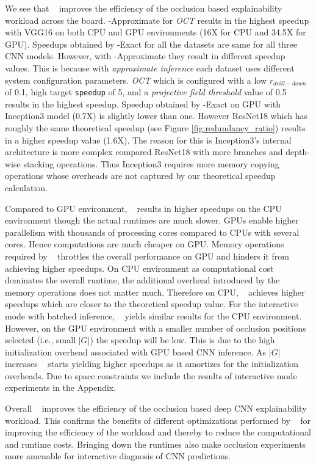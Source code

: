 We see that \system~ improves the efficiency of the occlusion based explainability workload across the board.
\system-Approximate for \textit{OCT} results in the highest speedup with VGG16 on both CPU and GPU environments (16X for CPU and 34.5X for GPU).
Speedups obtained by \system-Exact for all the datasets are same for all three CNN models.
However, with \system-Approximate they result in different speedup values.
This is because with \textit{approximate inference} each dataset uses different system configuration parameters.
\textit{OCT} which is configured with a low $r_{drill-down}$ of 0.1, high target \texttt{speedup} of 5, and a \textit{projective field threshold} value of 0.5 results in the highest speedup.
Speedup obtained by \system-Exact on GPU with Inception3 model (0.7X) is slightly lower than one.
However ResNet18 which has roughly the same theoretical speedup (see Figure \ref{fig:redundancy_ratio}) results in a higher speedup value (1.6X).
The reason for this is Inception3's internal architecture is more complex compared ResNet18 with more branches and depth-wise stacking operations.
Thus Inception3 requires more memory copying operations whose overheads are not captured by our theoretical speedup calculation.

Compared to GPU environment, \system~ results in higher speedups on the CPU environment though the actual runtimes are much slower.
GPUs enable higher parallelism with thousands of processing cores compared to CPUs with several cores.
Hence computations are much cheaper on GPU.
Memory operations required by \system~ throttles the overall performance on GPU and hinders it from achieving higher speedups.
On CPU environment as computational cost dominates the overall runtime, the additional overhead introduced by the memory operations does not matter much.
Therefore on CPU, \system~ achieves higher speedups which are closer to the theoretical speedup value.
For the interactive mode with batched inference, \system~ yields similar results for the CPU environment.
However, on the GPU environment with a smaller number of occlusion positions selected (i.e., small $|G|$) the speedup will be low.
This is due to the high initialization overhead associated with GPU based CNN inference.
As $|G|$ increases \system~ starts yielding higher speedups as it amortizes for the initialization overheads.
Due to space constraints we include the results of interactive mode experiments in the Appendix.


Overall \system~ improves the efficiency of the occlusion based deep CNN explainability workload.
This confirms the benefits of different optimizations performed by \system~ for improving the efficiency of the workload and thereby to reduce the computational and runtime costs.
Bringing down the runtimes also make occlusion experiments more amenable for interactive diagnosis of CNN predictions.


